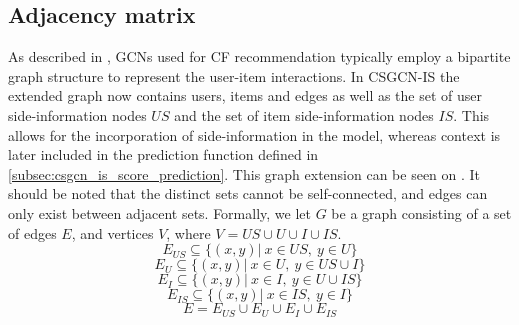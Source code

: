 \subsection{Adjacency matrix}\label{subsec:csgcn_is_adj_mat}
As described in , GCNs used for CF recommendation typically employ a bipartite graph structure to represent the user-item interactions.
In CSGCN-IS the extended graph now contains users, items and edges as well as the set of user side-information nodes $US$ and the set of item side-information nodes $IS$.
This allows for the incorporation of side-information in the model, whereas context is later included in the prediction function defined in \autoref{subsec:csgcn_is_score_prediction}.
This graph extension can be seen on .
It should be noted that the distinct sets cannot be self-connected, and edges can only exist between adjacent sets.
Formally, we let $G$ be a graph consisting of a set of edges $E$, and vertices $V$, where $V = US \cup U \cup I \cup IS$.
$$E_{US} \subseteq \{ (x,y) | \: x \in US, \: y \in U  \}$$
$$E_U \subseteq \{ (x,y) | \: x \in U, \: y \in US \cup I \}$$
$$E_I \subseteq \{ (x,y) | \: x \in I, \: y \in U \cup IS \}$$
$$E_{IS} \subseteq \{ (x,y) | \: x \in IS, \: y \in I  \}$$
$$E = E_{US} \cup E_{U} \cup E_{I} \cup E_{IS} $$

